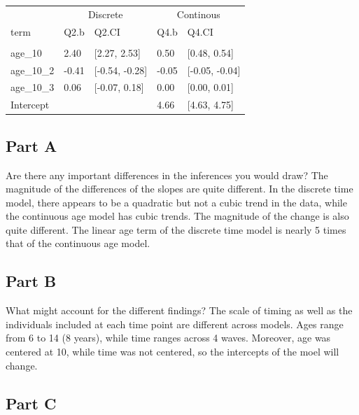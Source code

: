 \documentclass[]{article}
\begin{document}
\begin{table}[H]
\centering
\begin{tabular}{lllll}
\toprule
\multicolumn{1}{c}{ } & \multicolumn{2}{c}{Discrete} & \multicolumn{2}{c}{Continous} \\
\cmidrule(l{2pt}r{2pt}){2-3} \cmidrule(l{2pt}r{2pt}){4-5}
term & Q2.b & Q2.CI & Q4.b & Q4.CI\\
\midrule
\addlinespace[0.3em]
\multicolumn{5}{l}{\textbf{Fixed}}\\
\hspace{1em}age\_10 & 2.40 & [2.27, 2.53] & 0.50 & [0.48, 0.54]\\
\hspace{1em}age\_10\_2 & -0.41 & [-0.54, -0.28] & -0.05 & [-0.05, -0.04]\\
\hspace{1em}age\_10\_3 & 0.06 & [-0.07, 0.18] & 0.00 & [0.00, 0.01]\\
\hspace{1em}Intercept &  &  & 4.66 & [4.63, 4.75]\\
\bottomrule
\end{tabular}
\end{table}

\subsection{Part A}\label{part-a-2}

Are there any important differences in the inferences you would draw?
The magnitude of the differences of the slopes are quite different. In
the discrete time model, there appears to be a quadratic but not a cubic
trend in the data, while the continuous age model has cubic trends. The
magnitude of the change is also quite different. The linear age term of
the discrete time model is nearly 5 times that of the continuous age
model.

\subsection{Part B}\label{part-b-2}

What might account for the different findings? The scale of timing as
well as the individuals included at each time point are different across
models. Ages range from 6 to 14 (8 years), while time ranges across 4
waves. Moreover, age was centered at 10, while time was not centered, so
the intercepts of the moel will change.

\subsection{Part C}\label{part-c-1}
\end{document}
